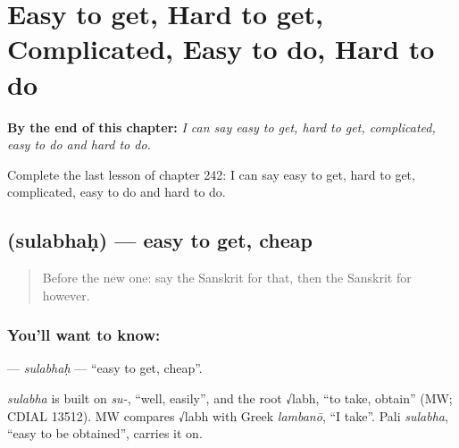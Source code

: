 
\chapter{Easy to get, Hard to get, Complicated, Easy to do, Hard to do}
\label{ch:sa-easy-to-get-hard-to-get-complicated-easy-to-do-hard-to-do}

\begin{chapteropening}
\textbf{By the end of this chapter:} \emph{I can say easy to get, hard to get, complicated, easy to do and hard to do.}

Complete the last lesson of chapter 242: I can say easy to get, hard to get, complicated, easy to do and hard to do.
\end{chapteropening}

\section[\texorpdfstring{\sk{सुलभः} (sulabhaḥ)}{सुलभः (sulabhaḥ)}]{ (sulabhaḥ) — easy to get, cheap}

\label{lesson:SA-C242-sulabhah}



\begin{quote}
Before the new one: say the Sanskrit for that, then the Sanskrit for however.
\end{quote}

\subsection*{You'll want to know: }
\textbf{} — \emph{sulabhaḥ} — \textquotedblleft{}easy to get, cheap\textquotedblright{}.

\begin{cousinweb}
\emph{sulabha} is built on \emph{su-}, \textquotedblleft{}well, easily\textquotedblright{}, and the root √labh, \textquotedblleft{}to take, obtain\textquotedblright{} (MW; CDIAL 13512). MW compares √labh with Greek \emph{lambanō}, \textquotedblleft{}I take\textquotedblright{}. Pali \emph{sulabha}, \textquotedblleft{}easy to be obtained\textquotedblright{}, carries it on.
\end{cousinweb}

